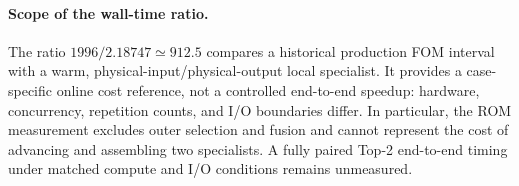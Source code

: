 \paragraph{Scope of the wall-time ratio.}
The ratio $1996/2.18747\simeq912.5$ compares a historical production
FOM interval with a warm, physical-input/physical-output local specialist.
It provides a case-specific online cost reference, not a controlled
end-to-end speedup: hardware, concurrency, repetition counts, and I/O
boundaries differ. In particular, the ROM measurement excludes outer
selection and fusion and cannot represent the cost of advancing and
assembling two specialists. A fully paired Top-2 end-to-end timing
under matched compute and I/O conditions remains unmeasured.

